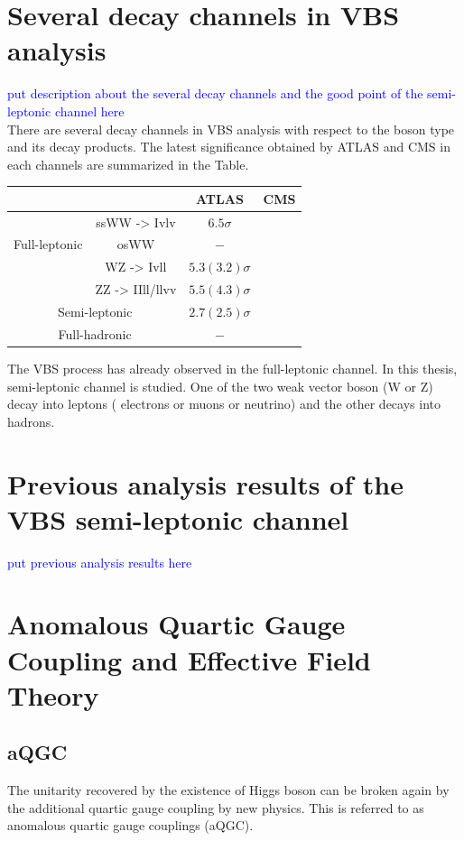 \section{Several decay channels in VBS analysis}
\textcolor{blue}{put description about the several decay channels and the good point of the semi-leptonic channel here}　\\
There are several decay channels in VBS analysis with respect to the boson type and its decay products. The latest significance obtained by ATLAS and CMS in each channels are summarized in the Table.

\begin{tabular}{|c|c|c|c|}
\hline \multicolumn{2}{|c|}{}                                   & ATLAS             & CMS\\
\hline
\hline \multirow{3}{*}{ Full-leptonic }      & ssWW -> Ivlv     & $6.5      \sigma$ &    \\
\cline { 2 - 4 }                             & osWW             & $-$               &    \\
\cline { 2 - 4 }                             & WZ -> Ivll       & $5.3(3.2) \sigma$ &    \\
\cline { 2 - 4 }                             & ZZ -> IIll/llvv  & $5.5(4.3) \sigma$ &    \\
\hline \multicolumn{2}{|c|}{ Semi-leptonic }                    & $2.7(2.5) \sigma$ &    \\
\hline \multicolumn{2}{|c|}{ Full-hadronic }                    & $-$               &    \\
\hline
\end{tabular}

The VBS process has already observed in the full-leptonic channel.
In this thesis, semi-leptonic channel is studied. One of the two weak vector boson (W or Z) decay into leptons ( electrons or muons or neutrino) and the other decays into hadrons.

\section{Previous analysis results of the VBS semi-leptonic channel}
\textcolor{blue}{put previous analysis results here}

\section{Anomalous Quartic Gauge Coupling and Effective Field Theory}

\subsection{aQGC}
The unitarity recovered by the existence of Higgs boson can be broken again by the additional quartic gauge coupling by new physics. This is referred to as anomalous quartic gauge couplings (aQGC). 

